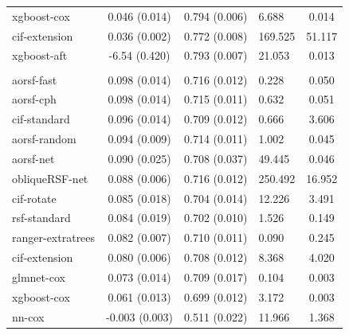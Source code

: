 \documentclass[twoside,11pt]{article}\usepackage[]{graphicx}\usepackage[]{xcolor}
\newenvironment{knitrout}{}{} %
\begin{document}
\begin{knitrout}
\begin{longtable}[t]{lcclc}
\hspace{1em}xgboost-cox & 0.046 (0.014) & 0.794 (0.006) & 6.688 & 0.014\\
\hspace{1em}cif-extension & 0.036 (0.002) & 0.772 (0.008) & 169.525 & 51.117\\
\hspace{1em}xgboost-aft & -6.54 (0.420) & 0.793 (0.007) & 21.053 & 0.013\\
\addlinespace[0.3em]
\hline
\multicolumn{5}{l}{\textit{\textbf{Colon cancer; death, n = 929, p = 12}}}\\
\hline
\hspace{1em}aorsf-fast & 0.098 (0.014) & 0.716 (0.012) & 0.228 & 0.050\\
\hspace{1em}aorsf-cph & 0.098 (0.014) & 0.715 (0.011) & 0.632 & 0.051\\
\hspace{1em}cif-standard & 0.096 (0.014) & 0.709 (0.012) & 0.666 & 3.606\\
\hspace{1em}aorsf-random & 0.094 (0.009) & 0.714 (0.011) & 1.002 & 0.045\\
\hspace{1em}aorsf-net & 0.090 (0.025) & 0.708 (0.037) & 49.445 & 0.046\\
\hspace{1em}obliqueRSF-net & 0.088 (0.006) & 0.716 (0.012) & 250.492 & 16.952\\
\hspace{1em}cif-rotate & 0.085 (0.018) & 0.704 (0.014) & 12.226 & 3.491\\
\hspace{1em}rsf-standard & 0.084 (0.019) & 0.702 (0.010) & 1.526 & 0.149\\
\hspace{1em}ranger-extratrees & 0.082 (0.007) & 0.710 (0.011) & 0.090 & 0.245\\
\hspace{1em}cif-extension & 0.080 (0.006) & 0.708 (0.012) & 8.368 & 4.020\\
\hspace{1em}glmnet-cox & 0.073 (0.014) & 0.709 (0.017) & 0.104 & 0.003\\
\hspace{1em}xgboost-cox & 0.061 (0.013) & 0.699 (0.012) & 3.172 & 0.003\\
\hspace{1em}nn-cox & -0.003 (0.003) & 0.511 (0.022) & 11.966 & 1.368\\

\end{longtable}
\end{knitrout}
\end{document}
